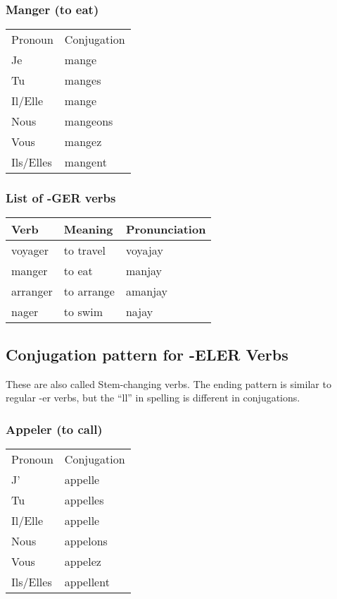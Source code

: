 \subsubsection{Manger (to eat)}
\begin{tabular}{| l | l |}
\hline
Pronoun 	& 	Conjugation	\\
Je		&	mange		\\
Tu		&	manges		\\
Il/Elle		&	mange		\\
Nous		&	mangeons	\\
Vous		&	mangez		\\
Ils/Elles	&	mangent		\\
\hline
\end{tabular}

\subsubsection{List of -GER verbs}
\begin{longtable}{| l | l | l |}
\hline
Verb 		& Meaning 		& Pronunciation	\\
\hline
\endhead
voyager 	& to travel		& voyajay	\\  \hline
manger		& to eat		& manjay	\\  \hline
arranger	& to arrange	& amanjay	\\  \hline
nager       & to swim       & najay		\\  \hline
\end{longtable}


\subsection{Conjugation pattern for -ELER Verbs}
These are also called Stem-changing verbs. The ending pattern is similar
to regular -er verbs, but the ``ll'' in spelling is different in conjugations.

\subsubsection{Appeler (to call)}
\begin{tabular}{| l | l |}
\hline
Pronoun 	& 	Conjugation	\\
J'		&	appelle		\\
Tu		&	appelles	\\
Il/Elle		&	appelle		\\
Nous		&	appelons	\\
Vous		&	appelez		\\
Ils/Elles	&	appellent	\\
\hline
\end{tabular}

